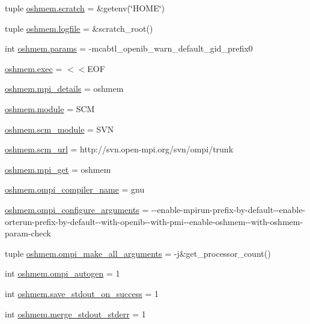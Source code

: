 \begin{DoxyCompactItemize}
\item 
tuple \hyperlink{namespaceoshmem_ac804c2050f1631747356112f02a6fa05}{oshmem.\-scratch} = \&getenv(\char`\"{}H\-O\-M\-E\char`\"{})
\item 
tuple \hyperlink{namespaceoshmem_a0dd8ce9816b9130b80561197098590a2}{oshmem.\-logfile} = \&scratch\-\_\-root()
\item 
int \hyperlink{namespaceoshmem_ab8b5930fba684193f3e00879ebb696b4}{oshmem.\-params} = -\/mcabtl\-\_\-openib\-\_\-warn\-\_\-default\-\_\-gid\-\_\-prefix0
\item 
\hyperlink{namespaceoshmem_a024aa040d2607b8bd6fb76522b0978c3}{oshmem.\-exec} = $<$$<$E\-O\-F
\item 
\hyperlink{namespaceoshmem_aeba1fd4df4f5814da0588fb749d7acfa}{oshmem.\-mpi\-\_\-details} = oshmem
\item 
\hyperlink{namespaceoshmem_a9406859c141622f8f2f7210af080e99c}{oshmem.\-module} = S\-C\-M
\item 
\hyperlink{namespaceoshmem_ab8796141a8629f1cfaedd19737a327c4}{oshmem.\-scm\-\_\-module} = S\-V\-N
\item 
\hyperlink{namespaceoshmem_a6be12ee0b0ec67ddd588e8fe63960fa9}{oshmem.\-scm\-\_\-url} = http\-://svn.\-open-\/mpi.\-org/svn/ompi/trunk
\item 
\hyperlink{namespaceoshmem_a4426807cb10649f44b732f4360d67069}{oshmem.\-mpi\-\_\-get} = oshmem
\item 
\hyperlink{namespaceoshmem_a1ba136fa8004e20e4cebfc4fc401869f}{oshmem.\-ompi\-\_\-compiler\-\_\-name} = gnu
\item 
\hyperlink{namespaceoshmem_a475fb23b33601f8274529d037c5f5ccc}{oshmem.\-ompi\-\_\-configure\-\_\-arguments} = -\/-\/enable-\/mpirun-\/prefix-\/by-\/default-\/-\/enable-\/orterun-\/prefix-\/by-\/default-\/-\/with-\/openib-\/-\/with-\/pmi-\/-\/enable-\/oshmem-\/-\/with-\/oshmem-\/param-\/check
\item 
tuple \hyperlink{namespaceoshmem_a81040e875d1354d954835bd3fb1639d2}{oshmem.\-ompi\-\_\-make\-\_\-all\-\_\-arguments} = -\/j\&get\-\_\-processor\-\_\-count()
\item 
int \hyperlink{namespaceoshmem_a44a772104c935ce09c4ddfd8a449cad3}{oshmem.\-ompi\-\_\-autogen} = 1
\item 
int \hyperlink{namespaceoshmem_aa4302b1909a7fd535f1aed0eafc49776}{oshmem.\-save\-\_\-stdout\-\_\-on\-\_\-success} = 1
\item 
int \hyperlink{namespaceoshmem_a54bae833e0060c0baf9bc9574845aea8}{oshmem.\-merge\-\_\-stdout\-\_\-stderr} = 1
$$
\end{DoxyCompactItemize}
